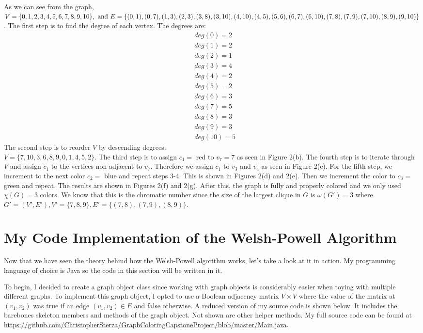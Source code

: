 \documentclass[12pt, letterpaper]{article}
\begin{document}
As we can see from the graph, $V=\{0,1,2,3,4,5,6,7,8,9,10\},\text{ and }\\
 E=\{(0,1),(0,7),(1,3),(2,3),(3,8),(3,10),(4,10),(4,5),(5,6),(6,7),\\(6,10),(7,8),(7,9),(7,10),(8,9),(9,10)\}$. The first step is to find the degree of each vertex. The degrees are:
 \begin{align*}
 &deg(0)=2\\
 &deg(1)=2\\
 &deg(2)=1\\
 &deg(3)=4\\
 &deg(4)=2\\
 &deg(5)=2\\
 &deg(6)=3\\
 &deg(7)=5\\
 &deg(8)=3\\
 &deg(9)=3\\
 &deg(10)=5
 \end{align*}
 The second step is to reorder $V$ by descending degrees. \\$V=\{7,10,3,6,8,9,0,1,4,5,2\}$.
 The third step is to assign $c_1 =$ red to $v_7 = 7$ as seen in Figure 2(b). The fourth step is to iterate through $V$ and assign $c_1$ to the vertices non-adjacent to $v_7$. Therefore we assign $c_1$ to $v_3$ and $v_4$ as seen in Figure 2(c). For the fifth step, we increment to the next color $c_2=$ blue and repeat steps 3-4. This is shown in Figures 2(d) and 2(e). Then we increment the color to $c_3 =$ green and repeat. The results are shown in Figures 2(f) and 2(g). After this, the graph is fully and properly colored and we only used $\chi(G)=3$ colors. We know that this is the chromatic number since the size of the largest clique in $G$ is $\omega(G')=3$ where $G'=(V',E'),V'=\{7,8,9\},E'=\{(7,8),(7,9),(8,9)\}$.
 
\section*{My Code Implementation of the Welsh-Powell Algorithm}
Now that we have seen the theory behind how the Welsh-Powell algorithm works, let's take a look at it in action. My programming language of choice is Java so the code in this section will be written in it.


To begin, I decided to create a graph object class since working with graph objects is considerably easier when toying with multiple different graphs. To implement this graph object, I opted to use a Boolean adjacency matrix $V\times V$ where the value of the matrix at $(v_1,v_2)$ was true if an edge $(v_1,v_2)\in E$ and false otherwise. A reduced version of my source code is shown below. It includes the barebones skeleton members and methods of the graph object. Not shown are other helper methods. My full source code can be found at \url{https://github.com/ChristopherSterza/GraphColoringCapstoneProject/blob/master/Main.java}.
\end{document}
